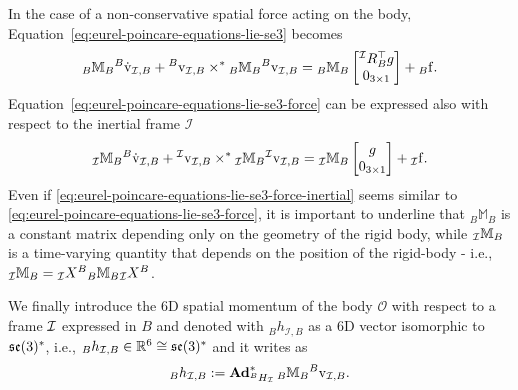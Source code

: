      \par
In the case of a non-conservative spatial force acting on the body, Equation~\eqref{eq:eurel-poincare-equations-lie-se3} becomes 
\begin{equation}
\label{eq:eurel-poincare-equations-lie-se3-force}
     {}_B \mathbb{M} _ B {}^B \dot{\mathrm{v}} _{\mathcal{I}, B } + {}^B \mathrm{v} _{\mathcal{I}, B } \times^* {}_B \mathbb{M} _ B {}^B \mathrm{v} _{\mathcal{I}, B }  = {}_B \mathbb{M} _ B \begin{bmatrix}
      {}^{\mathcal{I}} R _ B ^\top g \\ 
      0_{3\times1}
     \end{bmatrix} + {}_B \mathrm{f}.
\end{equation}
Equation~\eqref{eq:eurel-poincare-equations-lie-se3-force} can be expressed also with respect to the inertial frame $\mathcal{I}$ \begin{equation}
\label{eq:eurel-poincare-equations-lie-se3-force-inertial}
     {}_{\mathcal{I}} \mathbb{M} _ B {}^B \dot{\mathrm{v}} _{\mathcal{I}, B } + {}^{\mathcal{I}} \mathrm{v} _{\mathcal{I}, B } \times^* {}_{\mathcal{I}} \mathbb{M} _ B {}^{\mathcal{I}} \mathrm{v} _{\mathcal{I}, B }  = {}_{\mathcal{I}} \mathbb{M} _ B \begin{bmatrix}
      g \\ 
      0_{3\times1}
     \end{bmatrix} + {}_{\mathcal{I}} \mathrm{f}.
\end{equation}
Even if \eqref{eq:eurel-poincare-equations-lie-se3-force-inertial} seems similar to \eqref{eq:eurel-poincare-equations-lie-se3-force}, it is important to underline that $ {}_B \mathbb{M} _ B$ is a constant matrix depending only on the geometry of the rigid body, while $ {}_{\mathcal{I}} \mathbb{M} _ B$ is a time-varying quantity that depends on the position of the rigid-body - i.e.,  ${}_{\mathcal{I}} \mathbb{M} _ B =  {}_{\mathcal{I}} X ^B {}_B \mathbb{M} _ B {}_{\mathcal{I}} X ^B$.
\par
We finally introduce the 6D spatial momentum of the body $\mathcal{O}$ with respect to a frame $\mathcal{I}$ expressed in $B$  and denoted with ${}_B h_{\mathcal{I}, B} $ as a 6D vector isomorphic to $\mathfrak{se}(3)^*$, i.e., ${}_B h_{\mathcal{I}, B}  \in \mathbb{R}^6 \cong \mathfrak{se}(3)^*$ and it writes as 
\begin{equation}
    \label{eq:spatial_momentum-rigid_body}
    {}_B h_{\mathcal{I}, B} := \operatorname{\mathbf{Ad}}^*_{{}^B H _ \mathcal{I}} {}_B \mathbb{M} _ B {}^B \mathrm{v}_{\mathcal{I}, B}.
\end{equation}
